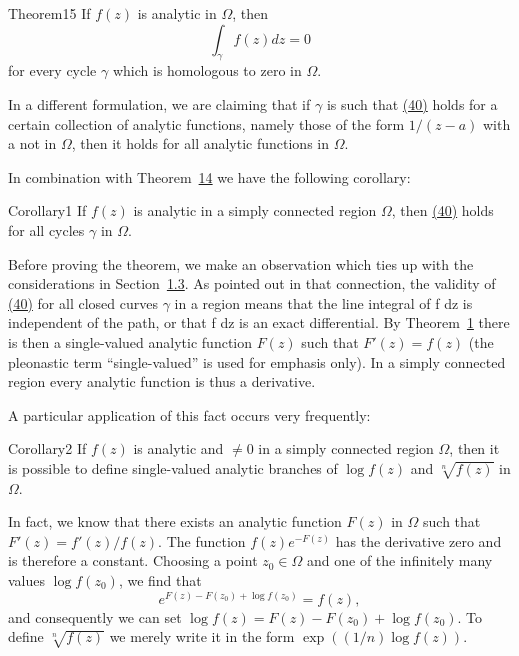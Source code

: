 \begin{originalstatement}{Theorem}{15}\label{thm:4.15}
If $f(z)$ is analytic in $\Omega$, then
\begin{equation*}
\int_ {\gamma} f (z) d z = 0\tag{40}\label{eq:4.40}
\end{equation*}
for every cycle $\gamma$ which is homologous to zero in $\Omega$.

\end{originalstatement}
In a different formulation, we are claiming that if $\gamma$ is such that \hyperref[eq:4.40]{(40)} holds for a certain collection of analytic functions, namely those of the form $1/(z - a)$ with a not in $\Omega$, then it holds for all analytic functions in $\Omega$.

In combination with Theorem~\hyperref[thm:4.14]{14} we have the following corollary:

\begin{originalstatement}{Corollary}{1}\label{cor:4.1-p157-b12}
If $f(z)$ is analytic in a simply connected region $\Omega$, then \hyperref[eq:4.40]{(40)} holds for all cycles $\gamma$ in $\Omega$.
\end{originalstatement}
Before proving the theorem, we make an observation which ties up with the considerations in Section~\hyperref[sec:4.1.3]{1.3}. As pointed out in that connection,
the validity of \hyperref[eq:4.40]{(40)} for all closed curves $\gamma$ in a region means that the line integral of f dz is independent of the path, or that f dz is an exact differential. By Theorem~\hyperref[thm:4.1]{1} there is then a single-valued analytic function $F(z)$ such that $F'(z) = f(z)$ (the pleonastic term “single-valued” is used for emphasis only). In a simply connected region every analytic function is thus a derivative.

A particular application of this fact occurs very frequently:

\begin{originalstatement}{Corollary}{2}\label{cor:4.2-p158-b2}
If $f(z)$ is analytic and $\neq 0$ in a simply connected region $\Omega$, then it is possible to define single-valued analytic branches of $\log f(z)$ and $\sqrt[n]{f(z)}$ in $\Omega$.
\end{originalstatement}
In fact, we know that there exists an analytic function $F(z)$ in $\Omega$ such that $F'(z) = f'(z)/f(z)$. The function $f(z)e^{-F(z)}$ has the derivative zero and is therefore a constant. Choosing a point $z_{0} \in \Omega$ and one of the infinitely many values $\log f(z_{0})$, we find that
\begin{equation*}
e ^ {F (z) - F (z _ {0}) + \log f (z _ {0})} = f (z),
\end{equation*}
and consequently we can set $\log f(z) = F(z) - F(z_0) + \log f(z_0)$. To define $\sqrt[n]{f(z)}$ we merely write it in the form $\exp((1/n) \log f(z))$.

